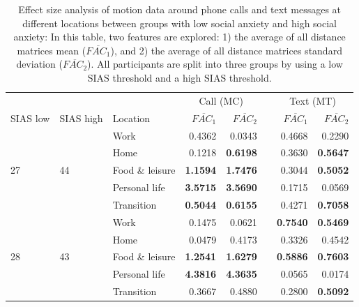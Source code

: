  
 \begin{table}
\caption{Effect size analysis of motion data around phone calls and text messages at different locations between groups with low social anxiety and high social anxiety: In this table, two features are explored: 1) the average of all distance matrices mean ($\overline{FAC_1}$), and 2) the average of all distance matrices standard deviation ($\overline{FAC_2}$). All participants are split into three groups by using a low SIAS threshold and a high SIAS threshold.
\label{tab:cohensd_matrix_call_text_GPS_3_group}\vspace{6pt}}
\begin{center}
\small
\def\arraystretch{1.5}
	\begin{tabular}{ l l @{\hskip 0.5in} l @{\hskip 0.5in} r r r r r}
    \toprule
    							&						&						& \multicolumn{2}{c}{Call (MC)} 						&	& \multicolumn{2}{c}{Text (MT)} 						\\
                    															\cline{4-5}											\cline{7-8}
    	SIAS low				& SIAS high				& Location				& $\overline{FAC_1}$	& $\overline{FAC_2}$			&	& $\overline{FAC_1}$		& $\overline{FAC_2}$		 	\\
        \hline
        						&						& Work					& 0.4362				& 0.0343				&	& 0.4668				& 0.2290				\\
        						&						& Home					& 0.1218				& \textbf{0.6198}				&	& 0.3630				& \textbf{0.5647}				\\
        27						& 44					& Food \& leisure		&\textbf{1.1594}				& \textbf{1.7476}				&	& 0.3044				& \textbf{0.5052}				\\
        						&						& Personal life			& \textbf{3.5715}				& \textbf{3.5690}				&	& 0.1715				& 0.0569				\\
        						&						& Transition			& \textbf{0.5044}				& \textbf{0.6155}				&	& 0.4271				& \textbf{0.7058}				\\
       \hline
        						&						& Work					& 0.1475				& 0.0621				&	& \textbf{0.7540}				& \textbf{0.5469}				\\
        						&						& Home					& 0.0479				& 0.4173				&	& 0.3326				& 0.4542				\\
       28						& 43					& Food \& leisure		& \textbf{1.2541}				& \textbf{1.6279}				&	& \textbf{0.5886}				& \textbf{0.7603}				\\
        						&						& Personal life			&\textbf{ 4.3816}				& \textbf{4.3635}				&	& 0.0565				& 0.0174				\\
        						&						& Transition			& 0.3667				& 0.4880				&	& 0.2800				& \textbf{0.5092}				\\

\end{tabular}
\end{center}
\end{table}
